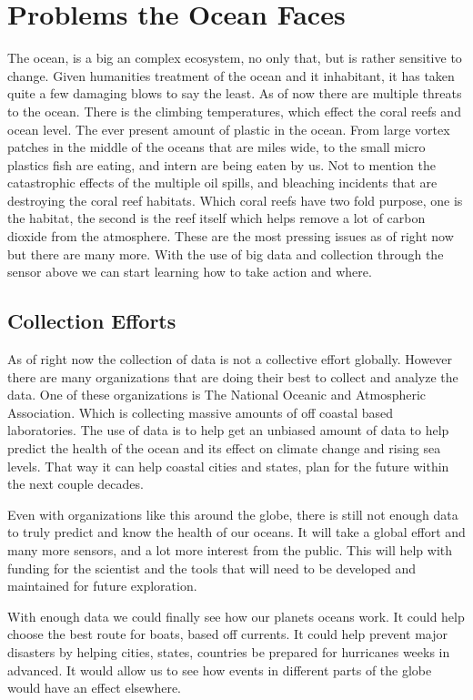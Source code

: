 \documentclass[sigconf]{acmart}
\begin{document}
\section{Problems the Ocean Faces}

The ocean, is a big an complex ecosystem, no only that, but is rather
sensitive to change.  Given humanities treatment of the ocean and it
inhabitant, it has taken quite a few damaging blows to say the least.
As of now there are multiple threats to the ocean.  There is the
climbing temperatures, which effect the coral reefs and ocean level.
The ever present amount of plastic in the ocean.  From large vortex
patches in the middle of the oceans that are miles wide, to the small
micro plastics fish are eating, and intern are being eaten by us. Not
to mention the catastrophic effects of the multiple oil spills, and
bleaching incidents that are destroying the coral reef habitats.
Which coral reefs have two fold purpose, one is the habitat, the
second is the reef itself which helps remove a lot of carbon dioxide
from the atmosphere.  These are the most pressing issues as of right
now but there are many more.  With the use of big data and collection
through the sensor above we can start learning how to take action and
where.

\subsection{Collection Efforts}

As of right now the collection of data is not a collective effort
globally. \citep{Delgnrain} However there are many organizations that
are doing their best to collect and analyze the data.  One of these
organizations is The National Oceanic and Atmospheric Association.
Which is collecting massive amounts of off coastal based laboratories.
The use of data is to help get an unbiased amount of data to help
predict the health of the ocean and its effect on climate change and
rising sea levels. That way it can help coastal cities and states,
plan for the future within the next couple decades.

Even with organizations like this around the globe, there is still not
enough data to truly predict and know the health of our oceans.  It
will take a global effort and many more sensors, and a lot more
interest from the public.  This will help with funding for the
scientist and the tools that will need to be developed and maintained
for future exploration.

With enough data we could finally see how our planets oceans work.  It
could help choose the best route for boats, based off currents.  It
could help prevent major disasters by helping cities, states,
countries be prepared for hurricanes weeks in advanced.  It would
allow us to see how events in different parts of the globe would have
an effect elsewhere.
\end{document}
